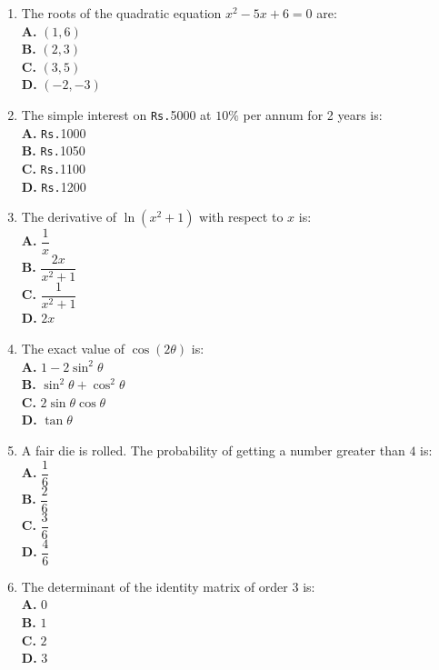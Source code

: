 \documentclass[11pt]{article}
\newcommand{\rupee}{\texttt{Rs.}}
\begin{document}
\begin{enumerate}[label=Q\arabic*., leftmargin=*]
\item The roots of the quadratic equation $x^2 - 5x + 6 = 0$ are:
\\[0.5em]
\textbf{A.} $(1, 6)$\\
\textbf{B.} $(2, 3)$\\
\textbf{C.} $(3, 5)$\\
\textbf{D.} $(-2, -3)$

\item The simple interest on \rupee{}5000 at $10\%$ per annum for 2 years is:
\\[0.5em]
\textbf{A.} \rupee{}1000\\
\textbf{B.} \rupee{}1050\\
\textbf{C.} \rupee{}1100\\
\textbf{D.} \rupee{}1200

\item The derivative of $\ln(x^2+1)$ with respect to $x$ is:
\\[0.5em]
\textbf{A.} $\dfrac{1}{x}$\\
\textbf{B.} $\dfrac{2x}{x^2+1}$\\
\textbf{C.} $\dfrac{1}{x^2+1}$\\
\textbf{D.} $2x$

\item The exact value of $\cos(2\theta)$ is:
\\[0.5em]
\textbf{A.} $1 - 2\sin^2\theta$\\
\textbf{B.} $\sin^2\theta + \cos^2\theta$\\
\textbf{C.} $2\sin\theta\cos\theta$\\
\textbf{D.} $\tan\theta$

\item A fair die is rolled. The probability of getting a number greater than $4$ is:
\\[0.5em]
\textbf{A.} $\dfrac{1}{6}$\\
\textbf{B.} $\dfrac{2}{6}$\\
\textbf{C.} $\dfrac{3}{6}$\\
\textbf{D.} $\dfrac{4}{6}$

\item The determinant of the identity matrix of order $3$ is:
\\[0.5em]
\textbf{A.} $0$\\
\textbf{B.} $1$\\
\textbf{C.} $2$\\
\textbf{D.} $3$


\end{enumerate}
\end{document}
